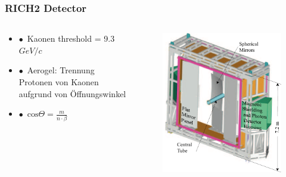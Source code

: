 \documentclass[aspectratio=1610, 12pt, xcolor=dvipsnames]{beamer}
\begin{document}
\begin{frame}\frametitle{RICH2 Detector}
  \begin{columns}
    \begin{column}[c]{0.48\textwidth}
      \begin{itemize}
	       \item $\bullet$\, Kaonen threshold = 9.3 $GeV/c$
         \item $\bullet$\, Aerogel: Trennung Protonen von Kaonen aufgrund von Öffnungswinkel
         \item $\bullet$\, $\text{cos}\Theta = \frac{m}{n\cdot\beta}$
      \end{itemize}
    \end{column}
    \begin{column}[c]{0.48\textwidth}
      \begin{figure}
	       \centering
	       \includegraphics[width=\textwidth]{plots/rich2.png}
      \end{figure}
    \end{column}
  \end{columns}
\end{frame}
\end{document}
